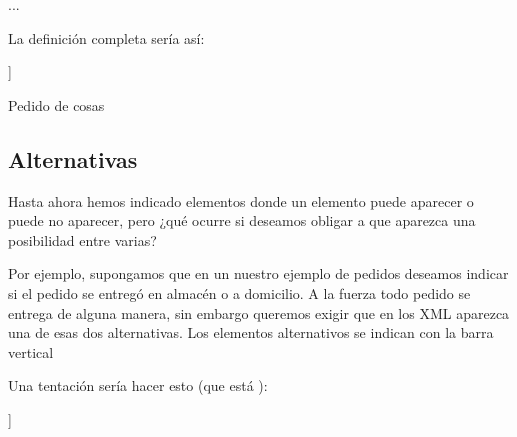 \documentclass[letterpaper,10pt,spanish]{sphinxmanual}
\begin{document}
\begin{sphinxVerbatim}[commandchars=\\\{\}]
        ...
\end{sphinxVerbatim}

La definición completa sería así:

\begin{sphinxVerbatim}[commandchars=\\\{\}]
\PYG{c+cp}{\PYGZlt{}!DOCTYPE pedido[}
]\PYGZgt{}

        Pedido de cosas
\end{sphinxVerbatim}


\subsection{Alternativas}
\label{\detokenize{tema5:alternativas}}
Hasta ahora hemos indicado elementos donde un elemento puede aparecer o puede no aparecer, pero ¿qué ocurre si deseamos obligar a que aparezca una posibilidad entre varias?

Por ejemplo, supongamos que en un nuestro ejemplo de pedidos deseamos indicar si el pedido se entregó en almacén o a domicilio. A la fuerza todo pedido se entrega de alguna manera, sin embargo queremos exigir que en los XML aparezca una de esas dos alternativas. Los elementos alternativos se indican con la barra vertical 

Una tentación sería hacer esto (que está ):

\begin{sphinxVerbatim}[commandchars=\\\{\}]
\PYG{c+cp}{\PYGZlt{}!DOCTYPE pedido[}
]\PYGZgt{}
\end{sphinxVerbatim}
\end{document}
